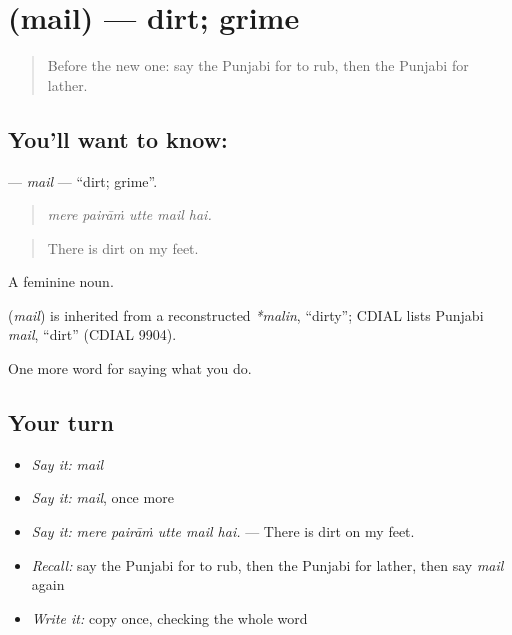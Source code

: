 \section[\texorpdfstring{\pa{ਮੈਲ} (mail)}{ਮੈਲ (mail)}]{ (mail) — dirt; grime}

\label{lesson:PA-C227-mail}



\begin{quote}
Before the new one: say the Punjabi for to rub, then the Punjabi for lather.
\end{quote}

\subsection*{You'll want to know: }
\textbf{} — \emph{mail} — \textquotedblleft{}dirt; grime\textquotedblright{}.

\begin{quote}
    
\end{quote}

\begin{quote}
\emph{mere pairāṁ utte mail hai.}
\end{quote}

\begin{quote}
There is dirt on my feet.
\end{quote}

A feminine noun.

\begin{cousinweb}
\textbf{} (\emph{mail}) is inherited from a reconstructed \emph{*malin}, \textquotedblleft{}dirty\textquotedblright{}; CDIAL lists Punjabi \emph{mail}, \textquotedblleft{}dirt\textquotedblright{} (CDIAL 9904).
\end{cousinweb}

\begin{grammarlens}[title={What you've built}]
One more word for saying what you do.
\end{grammarlens}

\subsection*{Your turn}
\begin{itemize}
\raggedright
  \item \emph{Say it:} \emph{mail}
  \item \emph{Say it:} \emph{mail}, once more
  \item \emph{Say it:} \emph{mere pairāṁ utte mail hai.} — There is dirt on my feet.
  \item \emph{Recall:} say the Punjabi for to rub, then the Punjabi for lather, then say \emph{mail} again
  \item \emph{Write it:} copy \textbf{} once, checking the whole word
\end{itemize}

